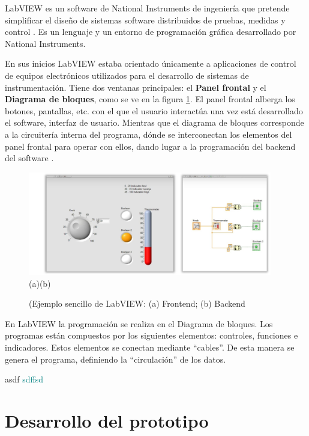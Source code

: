 	LabVIEW es un software de National Instruments de ingeniería que pretende simplificar el diseño de sistemas software distribuidos de pruebas, medidas y control \cite{LabVIEWpage}. Es un lenguaje y un entorno de programación gráfica desarrollado por National Instruments. 
	
	En sus inicios LabVIEW estaba orientado únicamente a aplicaciones de control de equipos electrónicos utilizados para el desarrollo de sistemas de instrumentación. Tiene dos ventanas principales: el \textbf{Panel frontal} y el \textbf{Diagrama de bloques}, como se ve en la figura \ref{fig:ejLabVIEW}. El panel frontal alberga los botones, pantallas, etc. con el que el usuario interactúa una vez está desarrollado el software, interfaz de usuario. Mientras que el diagrama de bloques corresponde a la circuitería interna del programa, dónde se interconectan los elementos del panel frontal para operar con ellos, dando lugar a la programación del backend del software \cite{LabVIEWbook}. 
	
  	\begin{figure}[H]
		\centering
		\includegraphics[width=0.95\textwidth]{./img/LabVIEWej}
		\\\hspace{2.5cm}(a)\hspace{6.5cm}(b)
		\caption{(Ejemplo sencillo de LabVIEW: (a) Frontend; (b) Backend}\cite{LabVIEWyt} 
		\label{fig:ejLabVIEW}
	\end{figure}

	En LabVIEW la programación se realiza en el Diagrama de bloques. Los programas están compuestos por los siguientes elementos: controles, funciones e indicadores. Estos elementos se conectan mediante ``cables''. De esta manera se genera el programa, definiendo la ``circulación'' de los datos.  
	

 \textcolor{rositaoscuro}{asdf}
 \textcolor{teal}{sdffsd}



\section{Desarrollo del prototipo}
\label{sec:prototipo3}

